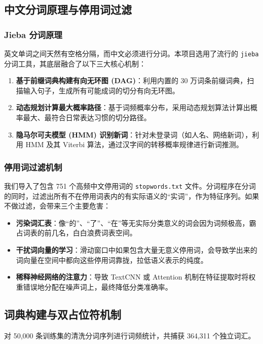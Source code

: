 \documentclass[UTF8,a4paper,11pt]{ctexart}
\begin{document}
\subsection{中文分词原理与停用词过滤}

\subsubsection{Jieba 分词原理}
英文单词之间天然有空格分隔，而中文必须进行分词。本项目选用了流行的 \texttt{jieba} 分词工具，其底层融合了以下三大核心机制：
\begin{enumerate}
    \item \textbf{基于前缀词典构建有向无环图 (DAG)}：利用内置的 30 万词条前缀词典，扫描输入句子，生成所有可能成词的切分有向无环图。
    \item \textbf{动态规划计算最大概率路径}：基于词频概率分布，采用动态规划算法计算出概率最大、最符合日常表达习惯的切分路径。
    \item \textbf{隐马尔可夫模型 (HMM) 识别新词}：针对未登录词（如人名、网络新词），利用 HMM 及其 Viterbi 算法，通过汉字间的转移概率规律进行新词推测。
\end{enumerate}

\subsubsection{停用词过滤机制}
我们导入了包含 751 个高频中文停用词的 \texttt{stopwords.txt} 文件。分词程序在分词的同时，过滤出所有不在停用词表内的有实际语义的“实词”，作为特征序列。如果不做过滤，会带来三个主要危害：
\begin{itemize}
    \item \textbf{污染词汇表}：像“的”、“了”、“在”等无实际分类意义的词会因为词频极高，霸占词表的前几名，白白浪费词表空间。
    \item \textbf{干扰词向量的学习}：滑动窗口中如果包含大量无意义停用词，会导致学出来的词向量在空间中都向这些停用词靠拢，拉低语义表示的纯度。
    \item \textbf{稀释神经网络的注意力}：导致 TextCNN 或 Attention 机制在特征提取时将权重错误地分配在噪声词上，最终降低分类准确率。
\end{itemize}

\subsection{词典构建与双占位符机制}
对 50,000 条训练集的清洗分词序列进行词频统计，共捕获 364,311 个独立词汇。
\end{document}
